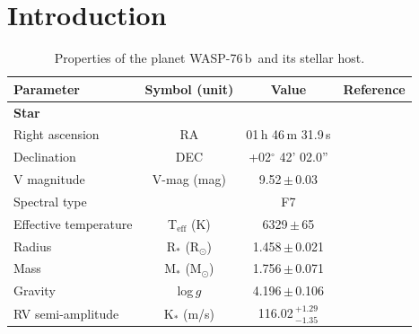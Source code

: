 \documentclass{aa}
\newcommand{\planet}{WASP-76\,b}
\begin{document}


\maketitle
%


\section{Introduction} \label{intro}


\begin{table}[h]
    \caption{Properties of the planet \planet\ and its stellar host.}
    \centering
    \begin{tabular}{lccc}
        \hline \hline
        Parameter & Symbol (unit) & Value & Reference \\
        \hline
        \noalign{\smallskip}
        \textbf{Star} &&& \\
        \noalign{\smallskip}
        Right ascension         & RA                                &  01\,h 46\,m 31.9\,s          & \citet{gaia2020} \\
        Declination             & DEC                               & +02$^{\circ}$ 42' 02.0''         & \citet{gaia2020} \\
        V magnitude             & V-mag (mag)                              & 9.52\,$\pm$\,0.03             & \citet{hog2000} \\
        Spectral type           &                                   & F7                            & \citet{west2016} \\
        Effective temperature   & T$_\mathrm{eff}$ (K)              & 6329\,$\pm$\,65               & \citet{ehrenreich2020} \\
        Radius                  & R$_*$ (R$_\odot$)                 & 1.458\,$\pm$\,0.021           & \citet{ehrenreich2020} \\
        Mass                    & M$_*$ (M$_\odot$)                 & 1.756\,$\pm$\,0.071           & \citet{ehrenreich2020} \\
        Gravity                 & log\,$g$                          & 4.196\,$\pm$\,0.106           & \citet{ehrenreich2020} \\
        RV semi-amplitude       & K$_*$ (m/s)                       & 116.02\,$^{+1.29}_{-1.35}$    & \citet{ehrenreich2020} \\

\end{tabular}
\end{table}
\end{document}
